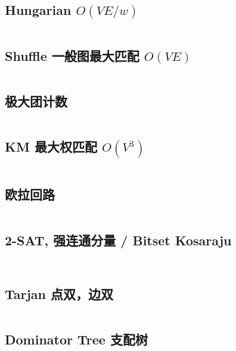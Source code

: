\documentclass[titlepage, a4paper]{article}
\begin{document}
\begin{multicols}{2}
\begin{spacing}{0.6}
				\subsection{Hungarian $O(V E / w)$}
					\inputminted{cpp}{src/TreeandGraph/Hungarian.cpp}
				\subsection{Shuffle 一般图最大匹配 $O(V E)$}
					\inputminted{cpp}{src/TreeandGraph/一般图最大匹配-shuffle.cpp}
				\subsection{极大团计数}
					\inputminted{cpp}{src/TreeandGraph/CliqueCount.cpp}
				\subsection{KM 最大权匹配 $O(V^3)$}
					\inputminted{cpp}{src/TreeandGraph/KM.cpp}
				\subsection{欧拉回路}
				\inputminted{cpp}{src/TreeandGraph/欧拉回路.cpp}
				\subsection{2-SAT, 强连通分量 / Bitset Kosaraju}
					\inputminted{cpp}{src/TreeandGraph/2-sat.cpp}
					\inputminted{cpp}{src/TreeandGraph/kosaraju.cpp}
				\subsection{Tarjan 点双，边双}
					\inputminted{cpp}{src/TreeandGraph/Tarjan.cpp}
				\subsection{Dominator Tree 支配树}
					\inputminted{cpp}{src/TreeandGraph/支配树.cpp}

\end{spacing}
\end{multicols}
\end{document}
